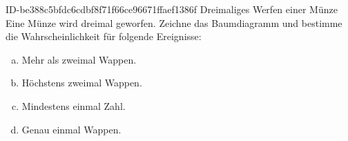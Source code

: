 \begin{exercise}
      {ID-be388c5bfdc6cdbf8f71f66ce96671ffaef1386f}
      {Dreimaliges Werfen einer Münze}
  \ifproblem\problem
    Eine Münze wird dreimal geworfen. Zeichne das Baumdiagramm und bestimme
    die Wahrscheinlichkeit für folgende Ereignisse:
    \begin{enumerate}[a)]
      \item Mehr als zweimal Wappen.
      \item Höchstens zweimal Wappen.
      \item Mindestens einmal Zahl.
      \item Genau einmal Wappen.
    \end{enumerate}
  \fi
\end{exercise}
